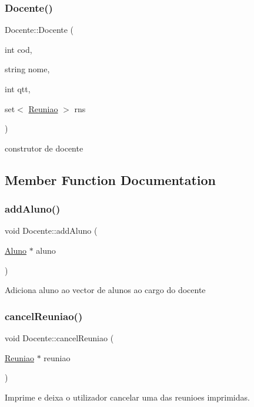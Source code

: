 \subsubsection{\texorpdfstring{Docente()}{Docente()}}
{\footnotesize\ttfamily Docente\+::\+Docente (\begin{DoxyParamCaption}\item[{int}]{cod,  }\item[{string}]{nome,  }\item[{int}]{qtt,  }\item[{set$<$ \hyperlink{class_reuniao}{Reuniao} $>$}]{rns }\end{DoxyParamCaption})}

construtor de docente 

\subsection{Member Function Documentation}
\hypertarget{class_docente_a9c594ff4aeb0fa373708c7440491c22d}{}\label{class_docente_a9c594ff4aeb0fa373708c7440491c22d} 
\subsubsection{\texorpdfstring{add\+Aluno()}{addAluno()}}
{\footnotesize\ttfamily void Docente\+::add\+Aluno (\begin{DoxyParamCaption}\item[{\hyperlink{class_aluno}{Aluno} $\ast$}]{aluno }\end{DoxyParamCaption})}

Adiciona aluno ao vector de alunos ao cargo do docente \hypertarget{class_docente_af850bd3ba1bdf87cb179b24713eb463b}{}\label{class_docente_af850bd3ba1bdf87cb179b24713eb463b} 
\subsubsection{\texorpdfstring{cancel\+Reuniao()}{cancelReuniao()}}
{\footnotesize\ttfamily void Docente\+::cancel\+Reuniao (\begin{DoxyParamCaption}\item[{\hyperlink{class_reuniao}{Reuniao} $\ast$}]{reuniao }\end{DoxyParamCaption})}

Imprime e deixa o utilizador cancelar uma das reunioes imprimidas. \hypertarget{class_docente_a852db58186f4e1a7e49dbaf35f8c567d}{}\label{class_docente_a852db58186f4e1a7e49dbaf35f8c567d} 
